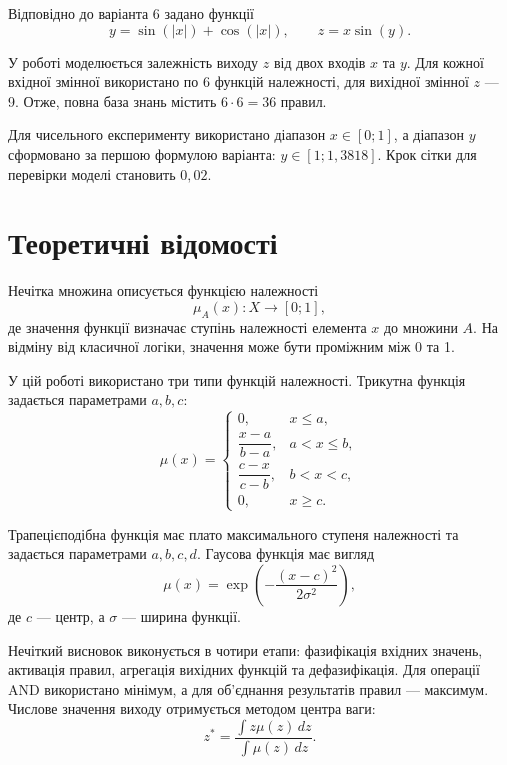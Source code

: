 \documentclass[12pt,a4paper]{article}
\begin{document}
Відповідно до варіанта 6 задано функції
\begin{equation}
  y=\sin(|x|)+\cos(|x|), \qquad z=x\sin(y).
  \label{eq:variant}
\end{equation}

У роботі моделюється залежність виходу $z$ від двох входів $x$ та $y$. Для кожної вхідної змінної використано по 6 функцій належності, для вихідної змінної $z$ --- 9. Отже, повна база знань містить $6\cdot6=36$ правил.

Для чисельного експерименту використано діапазон $x\in[0;1]$, а діапазон $y$ сформовано за першою формулою варіанта: $y\in[1;1{,}3818]$. Крок сітки для перевірки моделі становить $0{,}02$.

\section{Теоретичні відомості}

Нечітка множина описується функцією належності
\begin{equation}
  \mu_A(x):X\rightarrow[0;1],
\end{equation}
де значення функції визначає ступінь належності елемента $x$ до множини $A$. На відміну від класичної логіки, значення може бути проміжним між 0 та 1.

У цій роботі використано три типи функцій належності. Трикутна функція задається параметрами $a,b,c$:
\begin{equation}
\mu(x)=\begin{cases}
0,&x\leq a,\\
\dfrac{x-a}{b-a},&a<x\leq b,\\
\dfrac{c-x}{c-b},&b<x<c,\\
0,&x\geq c.
\end{cases}
\end{equation}

Трапецієподібна функція має плато максимального ступеня належності та задається параметрами $a,b,c,d$. Гаусова функція має вигляд
\begin{equation}
  \mu(x)=\exp\left(-\frac{(x-c)^2}{2\sigma^2}\right),
\end{equation}
де $c$ --- центр, а $\sigma$ --- ширина функції.

Нечіткий висновок виконується в чотири етапи: фазифікація вхідних значень, активація правил, агрегація вихідних функцій та дефазифікація. Для операції AND використано мінімум, а для об'єднання результатів правил --- максимум. Числове значення виходу отримується методом центра ваги:
\begin{equation}
  z^*=\frac{\int z\mu(z)\,dz}{\int\mu(z)\,dz}.
\end{equation}
\end{document}
